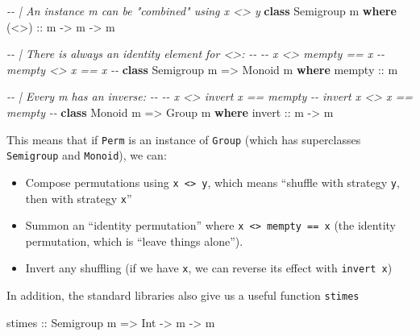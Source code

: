 \documentclass[]{article}
\newenvironment{Shaded}{}{}
\newcommand{\CommentTok}[1]{\textcolor[rgb]{0.38,0.63,0.69}{\textit{#1}}}
\newcommand{\DataTypeTok}[1]{\textcolor[rgb]{0.56,0.13,0.00}{#1}}
\newcommand{\KeywordTok}[1]{\textcolor[rgb]{0.00,0.44,0.13}{\textbf{#1}}}
\newcommand{\NormalTok}[1]{#1}
\newcommand{\OtherTok}[1]{\textcolor[rgb]{0.00,0.44,0.13}{#1}}
\begin{document}
\begin{Shaded}
\begin{Highlighting}[]
\CommentTok{{-}{-} | An instance m can be "combined" using \textasciigrave{}x \textless{}\textgreater{} y\textasciigrave{}}
\KeywordTok{class} \DataTypeTok{Semigroup}\NormalTok{ m }\KeywordTok{where}
\OtherTok{    (\textless{}\textgreater{}) ::}\NormalTok{ m }\OtherTok{{-}\textgreater{}}\NormalTok{ m }\OtherTok{{-}\textgreater{}}\NormalTok{ m}

\CommentTok{{-}{-} | There is always an identity element for \textless{}\textgreater{}:}
\CommentTok{{-}{-}}
\CommentTok{{-}{-} x \textless{}\textgreater{} mempty == x}
\CommentTok{{-}{-} mempty \textless{}\textgreater{} x == x}
\CommentTok{{-}{-}}
\KeywordTok{class} \DataTypeTok{Semigroup}\NormalTok{ m }\OtherTok{=\textgreater{}} \DataTypeTok{Monoid}\NormalTok{ m }\KeywordTok{where}
\OtherTok{    mempty ::}\NormalTok{ m}

\CommentTok{{-}{-} | Every m has an inverse:}
\CommentTok{{-}{-}}
\CommentTok{{-}{-} x \textless{}\textgreater{} invert x == mempty}
\CommentTok{{-}{-} invert x \textless{}\textgreater{} x == mempty}
\CommentTok{{-}{-}}
\KeywordTok{class} \DataTypeTok{Monoid}\NormalTok{ m }\OtherTok{=\textgreater{}} \DataTypeTok{Group}\NormalTok{ m }\KeywordTok{where}
\OtherTok{    invert ::}\NormalTok{ m }\OtherTok{{-}\textgreater{}}\NormalTok{ m}
\end{Highlighting}
\end{Shaded}

This means that if \texttt{Perm} is an instance of \texttt{Group} (which has
superclasses \texttt{Semigroup} and \texttt{Monoid}), we can:

\begin{itemize}
\tightlist
\item
  Compose permutations using \texttt{x\ \textless{}\textgreater{}\ y}, which
  means ``shuffle with strategy \texttt{y}, then with strategy \texttt{x}''
\item
  Summon an ``identity permutation'' where
  \texttt{x\ \textless{}\textgreater{}\ mempty\ ==\ x} (the identity
  permutation, which is ``leave things alone'').
\item
  Invert any shuffling (if we have \texttt{x}, we can reverse its effect with
  \texttt{invert\ x})
\end{itemize}

In addition, the standard libraries also give us a useful function
\texttt{stimes}

\begin{Shaded}
\begin{Highlighting}[]
\OtherTok{stimes ::} \DataTypeTok{Semigroup}\NormalTok{ m }\OtherTok{=\textgreater{}} \DataTypeTok{Int} \OtherTok{{-}\textgreater{}}\NormalTok{ m }\OtherTok{{-}\textgreater{}}\NormalTok{ m}
\end{Highlighting}
\end{Shaded}
\end{document}
